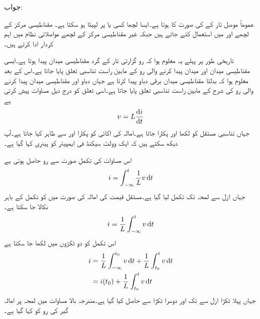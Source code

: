 جواب:

 عموماً موصل تار کے  کی صورت کا ہوتا ہے۔ایسا لچھا کسی  یا  پر لپیٹا ہو سکتا ہے۔ مقناطیسی مرکز کے لچھے  اور  میں استعمال کئے جاتے ہیں جبکہ غیر مقناطیسی مرکز کے لچھے مواصلاتی نظام میں اہم کردار ادا کرتے ہیں۔

تاریخی طور پر پہلے یہ معلوم ہوا کہ رو گزارتی تار کے گرد مقناطیسی میدان پیدا ہوتا ہے۔ایسی مقناطیسی میدان اور میدان پیدا کرنے والی رو کے مابین راست تناسبی تعلق پایا جاتا ہے۔اس کے بعد معلوم ہوا کہ بدلتا مقناطیسی میدان برقی دباو پیدا کرتا ہے جہاں دباو اور مقناطیسی میدان پیدا کرنے والی رو کی شرح کے مابین راست تناسبی تعلق پایا جاتا ہے۔اسی تعلق کو درج ذیل مساوات پیش کرتی ہے
\begin{align}\label{مساوات_امالہ_بنیادی_مساوات_امالہ_الف}
v=L \frac{\dif i}{\dif t}
\end{align}
جہاں تناسبی مستقل کو  لکھا اور  پکارا جاتا ہے۔امالہ کی اکائی کو  پکارا اور  سے ظاہر کیا جاتا ہے۔آپ دیکھ سکتے ہیں کہ ایک وولٹ سیکنڈ فی ایمپیئر  کو ہینری کہا گیا ہے۔ 

اس مساوات کی تکمل صورت سے رو حاصل ہوتی ہے
\begin{align}
i=\int_{-\infty}^{t}\frac{1}{L} v \dif t
\end{align}
جہاں ازل  سے لمحہ  تک تکمل لیا گیا ہے۔مستقل قیمت کی امالہ کی صورت میں  کو تکمل کے باہر نکالا جا سکتا ہے۔
\begin{align}
i=\frac{1}{L}\int_{-\infty}^{t} v \dif t
\end{align}
اس تکمل کو دو ٹکڑوں میں لکھا جا سکتا ہے 
\begin{gather}
\begin{aligned}
i&=\frac{1}{L}\int_{-\infty}^{t_0} v \dif t+\frac{1}{L} \int_{t_0}^{t} v \dif t\\
&=i(t_0)+\frac{1}{L} \int_{t_0}^{t} v \dif t
\end{aligned}
\end{gather}
جہاں پہلا ٹکڑا ازل سے  تک اور دوسرا ٹکڑا  سے  حاصل کیا گیا ہے۔مندرجہ بالا مساوات میں لمحہ  پر امالہ گیر کی رو کو  کہا گیا ہے۔

